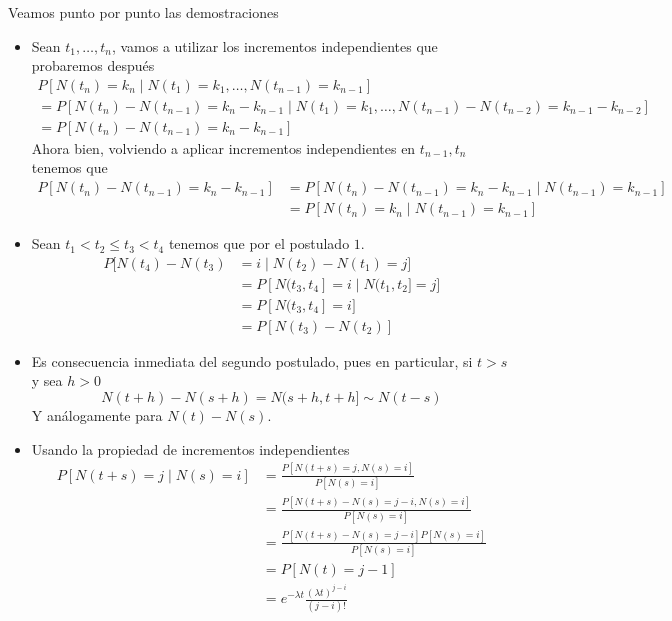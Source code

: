 \documentclass[twoside]{article}
\begin{document}
\begin{solucion}
Veamos punto por punto las demostraciones
\begin{itemize}
\item Sean $t_1,\dotsc,t_n$, vamos a utilizar los incrementos independientes que probaremos después
\begin{gather*}
P[N(t_n) =  k_n \mid N(t_1)=k_1,\dotsc,N(t_{n-1})=k_{n-1}] \\= P[N(t_n) -N(t_{n-1}) =  k_n - k_{n-1}\mid N(t_1)=k_1,\dotsc,N(t_{n-1})-N(t_{n-2})=k_{n-1}-k_{n-2}]\\
=P[N(t_n)-N(t_{n-1})=k_n - k_{n-1}]
\end{gather*}
Ahora bien, volviendo a aplicar incrementos independientes en $t_{n-1},t_n$ tenemos que 
\begin{align*}
P[N(t_n)-N(t_{n-1})=k_n - k_{n-1}] &= P[N(t_n)-N(t_{n-1})=k_n - k_{n-1}\mid N(t_{n-1}) = k_{n-1}]\\
&= P[N(t_n)=k_n \mid N(t_{n-1})=k_{n-1}]
\end{align*}
\item Sean $t_1<t_2\leq t_3<t_4$ tenemos que por el postulado $1$.
\begin{align*}
P[N(t_4)-N(t_3)& = i\mid N(t_2)-N(t_1)=j]\\
& = P[N(t_3,t_4]=i \mid N(t_1,t_2]=j] \\
&= P[N(t_3,t_4]=i] \\
&= P[N(t_3)-N(t_2)]
\end{align*}
\item Es consecuencia inmediata del segundo postulado, pues en particular, si $t>s$ y sea $h>0$
$$N(t+h)-N(s+h)=N(s+h,t+h] \sim N(t-s) $$
Y análogamente para $N(t)-N(s)$. 
\item Usando la propiedad de incrementos independientes
\begin{align*}
P[N(t+s)=j\mid N(s)=i] &= \frac{P[N(t+s)=j,  N(s)=i]}{P[N(s)=i]}\\
&=\frac{P[N(t+s)-N(s)=j-i,  N(s)=i]}{P[N(s)=i]}\\
&=\frac{P[N(t+s)-N(s)=j-i]P[N(s)=i]}{P[N(s)=i]}\\
&=P[N(t)=j-1]\\
&=e^{-\lambda t}\frac{(\lambda t)^{j-i}}{(j-i)!}
\end{align*}
\end{itemize}
\end{solucion}
\end{document}
